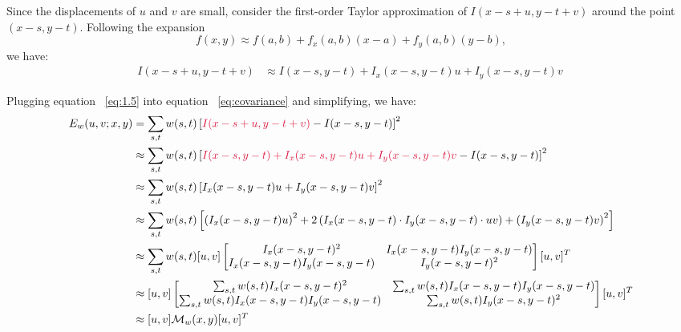 \newpage
\begin{Answer}
  Since the displacements of $u$ and $v$ are small,
  consider the first-order Taylor approximation of $I(x-s+u,y-t+v)$ around the point $(x-s, y-t)$.
  Following the expansion
  \[ f(x,y) \approx f(a,b) + f_x(a,b)(x-a) + f_y(a,b)(y-b), \]
  we have:
  \begin{align}
    I(x-s+u,y-t+v) &\approx I(x-s,y-t) + I_x(x-s,y-t)u + I_y(x-s,y-t)v ~\label{eq:1.5}
  \end{align}

  \step
  Plugging equation ~\eqref{eq:1.5} into equation ~\eqref{eq:covariance} and simplifying,
  we have:
  \begin{align}
    E_w(u,v;x,y) &= \sum_{s,t} w(s,t) \left[\crim{I(x-s+u,y-t+v)} - I(x-s,y-t)\right]^2 \nonumber \\
    &\approx \sum_{s,t} w(s,t) \left[\crim{I(x-s,y-t) + I_x(x-s,y-t)u + I_y(x-s,y-t)v} - I(x-s,y-t)\right]^2 \nonumber \\
    &\approx \sum_{s,t} w(s,t) \left[I_x(x-s,y-t)u + I_y(x-s,y-t)v\right]^2 \nonumber \\
    &\approx \sum_{s,t} w(s,t) \left[\left(I_x(x-s,y-t)u\right)^2 + 2\left(I_x(x-s,y-t) \cdot I_y(x-s,y-t) \cdot uv\right) + \left(I_y(x-s,y-t)v\right)^2\right] \nonumber \\
    &\approx \sum_{s,t} w(s,t) [u, v]
      \begin{bmatrix}
        I_x(x-s,y-t)^2 & I_x(x-s,y-t)I_y(x-s,y-t) \\
        I_x(x-s,y-t)I_y(x-s,y-t) & I_y(x-s,y-t)^2
      \end{bmatrix}
    [u, v]^T\nonumber \\
    &\approx[u, v]
    \begin{bmatrix}
      \sum_{s,t} w(s,t) I_x(x-s,y-t)^2 &   \sum_{s,t} w(s,t) I_x(x-s,y-t)I_y(x-s,y-t) \\
      \sum_{s,t} w(s,t) I_x(x-s,y-t)I_y(x-s,y-t) &   \sum_{s,t} w(s,t) I_y(x-s,y-t)^2
    \end{bmatrix}
  [u, v]^T \nonumber \\
  &\approx [u, v] {\calM}_w(x,y) [u, v]^T\nonumber
  \end{align}
\end{Answer}
